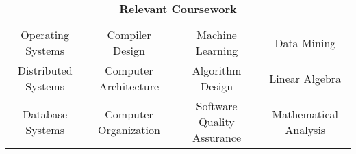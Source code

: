\vspace*{-\baselineskip}
\begin{table}[H]
    \centering
    \caption*{\textbf{Relevant Coursework}}
    \vspace*{-\baselineskip}
    \begin{tabular}{@{}cccc@{}}
        Operating Systems   & Compiler Design       & Machine Learning           & Data Mining           \\
        Distributed Systems & Computer Architecture & Algorithm Design           & Linear Algebra        \\
        Database Systems    & Computer Organization & Software Quality Assurance & Mathematical Analysis \\
    \end{tabular}
\end{table}
\vspace*{-2\baselineskip}